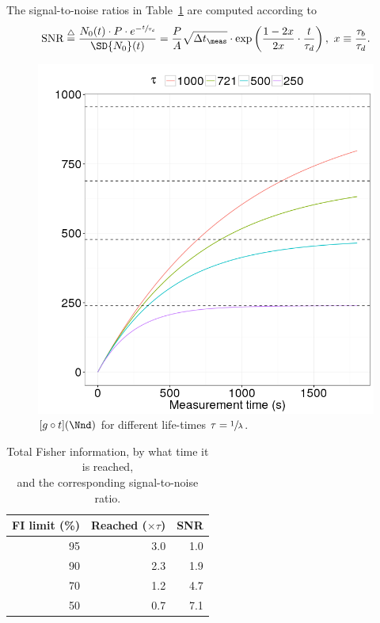\documentclass{article}
\newcommand{\dt}{\Delta t}
\newcommand{\dtm}{\dt_{\meas}}
\newcommand{\LTb}{\tau_b}
\newcommand{\LTd}{\tau_d}
\begin{document}
\newcommand{\SNR}{\text{SNR}}
\newcommand{\deq}{\overset{\triangle}{=}}
The signal-to-noise ratios in Table~\ref{tbl:FItot} are computed according to
\begin{equation}\label{eq:TauRatioSNR}
\SNR \deq \frac{N_0(t)\cdot P\cdot e^{-\sfrac{t}{\LTd}}}{\SD{N_0}(t)} 
= \frac{P}{A}\sqrt{\dtm}\cdot\exp\bkt{\frac{1-2x}{2x}\cdot\frac{t}{\LTd}},~ x\equiv \frac{\LTb}{\LTd}.
\end{equation}
\begin{figure}[h]
	\centering
	\includegraphics[scale=.5]{img/StatReq/XtotOnTime}
	\caption{$[g\circ t](\Nnd)$ for different life-times $\tau = \sfrac1\lambda$.\label{fig:GofT}}
\end{figure}
\begin{table}[h]
	\centering
	\caption{Total Fisher information, by what time it is reached,\\ and the corresponding signal-to-noise ratio.\label{tbl:FItot}}
	\begin{tabular}{rrr}
		\hline
		FI limit (\%) & Reached ($\times\tau$) & SNR \\ \hline
		           95 &                    3.0 & 1.0 \\
		           90 &                    2.3 & 1.9 \\
		           70 &                    1.2 & 4.7 \\
		           50 &                    0.7 & 7.1 \\ \hline
	\end{tabular}
\end{table}
\end{document}
